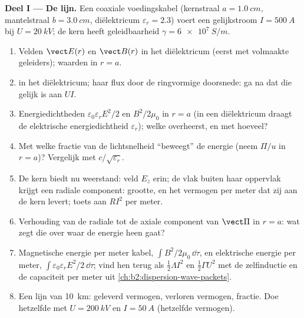 \begin{problem}
\label{pb:b2:poynting-vector:1}

\medskip
\noindent\textbf{Deel I --- De lijn.}
Een coaxiale voedingskabel (kernstraal $a = \qty{1.0}{cm}$, mantelstraal
$b =
\qty{3.0}{cm}$, diëlektricum $\varepsilon_r = 2.3$) voert een
gelijkstroom $I =
\qty{500}{A}$ bij $U = \qty{20}{kV}$; de kern heeft
geleidbaarheid $\gamma =
\qty{6e7}{S/m}$.
\begin{enumerate}
  \item Velden $\vect E(r)$ en $\vect B(r)$ in het diëlektricum (eerst met
        volmaakte geleiders); waarden in $r = a$.
  \item {} in het diëlektricum; haar flux door de ringvormige
        doorsnede: ga na dat die gelijk is aan $UI$.
  \item Energiedichtheden $\varepsilon_0\varepsilon_rE^2/2$ en $B^2/2\mu_0$
        in $r = a$ (in een diëlektricum draagt de elektrische
        energiedichtheid $\varepsilon_r$); welke overheerst, en met hoeveel?
  \item Met welke fractie van de lichtsnelheid ``beweegt'' de energie (neem
        $\Pi/u$ in $r = a$)? Vergelijk met $c/\sqrt{\varepsilon_r}$.
  \item De kern biedt nu weerstand: veld $E_z$ erin; de  vlak
        buiten haar oppervlak krijgt een radiale component: grootte, en het
        vermogen per meter dat zij aan de kern levert; toets aan $RI^2$ per
        meter.
  \item Verhouding van de radiale tot de axiale component van $\vect\Pi$ in
        $r =
        a$: wat zegt die over waar de energie heen gaat?
  \item Magnetische energie per meter kabel, $\int B^2/2\mu_0\,\dd\tau$, en
        elektrische energie per meter,
        $\int\varepsilon_0\varepsilon_rE^2/2\,\dd\tau$; vind hen terug als
        $\tfrac12\Lambda I^2$ en $\tfrac12\Gamma U^2$ met de zelfinductie en
        de capaciteit per meter uit \cref{ch:b2:dispersion-wave-packets}.
  \item Een lijn van \qty{10}{km}: geleverd vermogen, verloren vermogen,
        fractie. Doe hetzelfde met $U = \qty{200}{kV}$ en $I = \qty{50}{A}$
        (hetzelfde vermogen).
\end{enumerate}


\end{problem}
